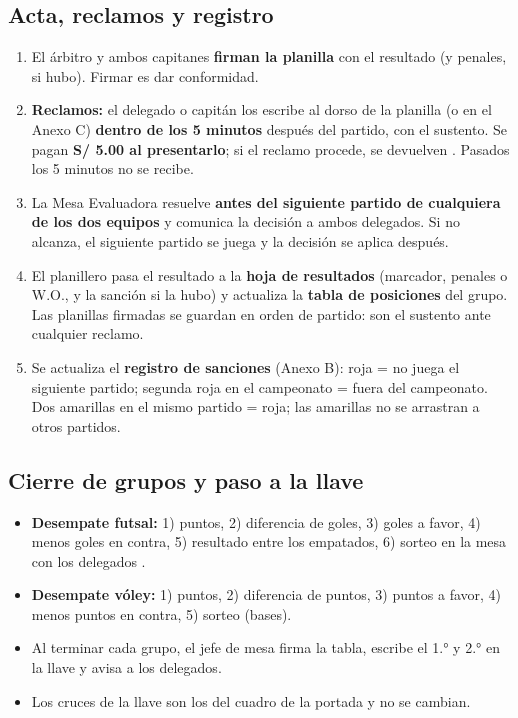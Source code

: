 \subsection{Acta, reclamos y registro}
\begin{enumerate}
	\item El árbitro y ambos capitanes \textbf{firman la planilla} con el resultado (y penales, si hubo). Firmar es dar conformidad.
	\item \textbf{Reclamos:} el delegado o capitán los escribe al dorso de la planilla (o en el Anexo C) \textbf{dentro de los 5 minutos} después del partido, con el sustento. Se pagan \textbf{S/ 5.00 al presentarlo}; si el reclamo procede, se devuelven . Pasados los 5 minutos no se recibe.
	\item La Mesa Evaluadora resuelve \textbf{antes del siguiente partido de cualquiera de los dos equipos} y comunica la decisión a ambos delegados. Si no alcanza, el siguiente partido se juega y la decisión se aplica después.
	\item El planillero pasa el resultado a la \textbf{hoja de resultados} (marcador, penales o W.O., y la sanción si la hubo) y actualiza la \textbf{tabla de posiciones} del grupo. Las planillas firmadas se guardan en orden de partido: son el sustento ante cualquier reclamo.
	\item Se actualiza el \textbf{registro de sanciones} (Anexo B): roja = no juega el siguiente partido; segunda roja en el campeonato = fuera del campeonato. Dos amarillas en el mismo partido = roja; las amarillas no se arrastran a otros partidos.
\end{enumerate}

\subsection{Cierre de grupos y paso a la llave}
\begin{itemize}
	\item \textbf{Desempate futsal:} 1) puntos, 2) diferencia de goles, 3) goles a favor, 4) menos goles en contra, 5) resultado entre los empatados, 6) sorteo en la mesa con los delegados .
	\item \textbf{Desempate vóley:} 1) puntos, 2) diferencia de puntos, 3) puntos a favor, 4) menos puntos en contra, 5) sorteo (bases).
	\item Al terminar cada grupo, el jefe de mesa firma la tabla, escribe el 1.° y 2.° en la llave y avisa a los delegados.
	\item Los cruces de la llave son los del cuadro de la portada y no se cambian.
\end{itemize}

